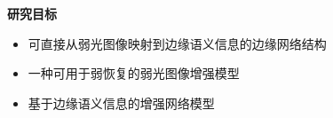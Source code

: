 \documentclass[CJK,aspectratio=169]{beamer}  %
\begin{document}
	\begin{frame}
		{ \yahei \textbf{研究目标}}
		
		\begin{itemize}
			\item [\checkmark]
			可直接从弱光图像映射到边缘语义信息的边缘网络结构
			
			\vspace{0.5cm}
			
			\item [\checkmark]
			一种可用于弱恢复的弱光图像增强模型
	
			\vspace{0.5cm}
			
			\item [\checkmark]
			基于边缘语义信息的增强网络模型
		\end{itemize}
		
	\end{frame}
	
\end{document}

